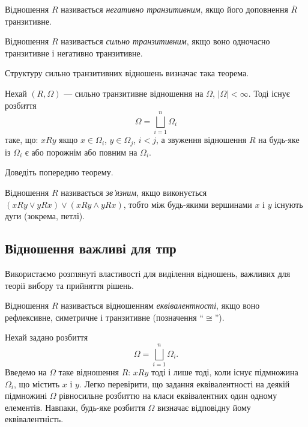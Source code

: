 \begin{definition}
	Відношення $R$ називається \textit{негативно транзитивним}, якщо його доповнення $\overline{R}$ транзитивне.
\end{definition}

\begin{definition}
	Відношення $R$ називається \textit{сильно транзитивним}, якщо воно одночасно транзитивне і негативно транзитивне.
\end{definition}

Структуру сильно транзитивних відношень визначає така теорема.

\begin{theorem}
	Нехай $(R, \Omega)$ --- сильно транзитивне відношення на $\Omega$, $|\Omega| < \infty$. Тоді існує розбиття \begin{equation} \Omega = \bigsqcup\limits_{i = 1}^n \Omega_i \end{equation} таке, що: $x R y$ якщо $x \in \Omega_i$, $y \in \Omega_j$, $i < j$, а звуження відношення $R$ на будь-яке із $\Omega_i$ є або порожнім або повним на $\Omega_i$.
\end{theorem}

\begin{sproblem}
	Доведіть попередню теорему.
\end{sproblem}

\begin{definition}
	Відношення $R$ називається \textit{зв'язним}, якщо виконується $(x R y \lor y R x) \lor (x R y \land y R x)$, тобто між будь-якими вершинами $x$ і $y$ існують дуги (зокрема, петлі).
\end{definition}

\subsection{Відношення важливі для тпр}

Використаємо розглянуті властивості для виділення відношень, важливих для теорії вибору та прийняття рішень.

\begin{definition}
	Відношення $R$ називається відношенням \textit{еквівалентності}, якщо воно рефлексивне, симетричне і транзитивне (позначення ``$\cong$'').
\end{definition}

Нехай задано розбиття \begin{equation} \Omega = \bigsqcup\limits_{i = 1}^n \Omega_i.\end{equation} Введемо на $\Omega$ таке відношення $R$: $x R y$ тоді і лише тоді, коли існує підмножина $\Omega_i$, що містить $x$ і $y$. Легко перевірити, що задання еквівалентності на деякій підмножині $\Omega$ рівносильне розбиттю на класи еквівалентних один одному елементів. Навпаки, будь-яке розбиття $\Omega$ визначає відповідну йому еквівалентність.

